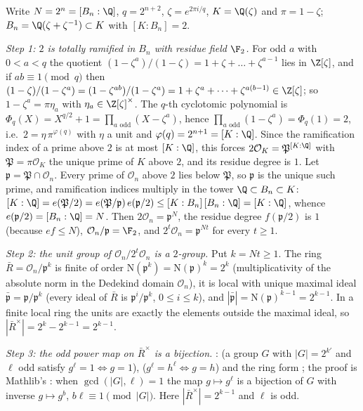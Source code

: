 Write $N=2^n=[B_n:\Q]$, $q=2^{n+2}$, $\zeta=e^{2\pi i/q}$, $K=\Q(\zeta)$ and $\pi=1-\zeta$; $B_n=\Q(\zeta+\zeta^{-1})\subset K$ with $[K:B_n]=2$.

\emph{Step 1: $2$ is totally ramified in $B_n$ with residue field $\F_2$.} For odd $a$ with $0<a<q$ the quotient $(1-\zeta^a)/(1-\zeta)=1+\zeta+\dots+\zeta^{a-1}$ lies in $\Z[\zeta]$, and if $ab\equiv1\pmod q$ then $(1-\zeta)/(1-\zeta^a)=(1-\zeta^{ab})/(1-\zeta^a)=1+\zeta^a+\dots+\zeta^{a(b-1)}\in\Z[\zeta]$; so $1-\zeta^a=\pi\eta_a$ with $\eta_a\in\Z[\zeta]^\times$. The $q$-th cyclotomic polynomial is $\Phi_q(X)=X^{q/2}+1=\prod_{a\text{ odd}}(X-\zeta^a)$, hence $\prod_{a\text{ odd}}(1-\zeta^a)=\Phi_q(1)=2$, i.e.\ $2=\eta\,\pi^{\varphi(q)}$ with $\eta$ a unit and $\varphi(q)=2^{n+1}=[K:\Q]$. Since the ramification index of a prime above $2$ is at most $[K:\Q]$, this forces $2\mathcal O_K=\mathfrak P^{[K:\Q]}$ with $\mathfrak P=\pi\mathcal O_K$ the unique prime of $K$ above $2$, and its residue degree is $1$. Let $\mathfrak p=\mathfrak P\cap\mathcal O_n$. Every prime of $\mathcal O_n$ above $2$ lies below $\mathfrak P$, so $\mathfrak p$ is the unique such prime, and ramification indices multiply in the tower $\Q\subset B_n\subset K$: $[K:\Q]=e(\mathfrak P/2)=e(\mathfrak P/\mathfrak p)\,e(\mathfrak p/2)\le[K:B_n]\,[B_n:\Q]=[K:\Q]$, whence $e(\mathfrak p/2)=[B_n:\Q]=N$. Then $2\mathcal O_n=\mathfrak p^N$, the residue degree $f(\mathfrak p/2)$ is $1$ (because $e f\le N$), $\mathcal O_n/\mathfrak p=\F_2$, and $2^t\mathcal O_n=\mathfrak p^{Nt}$ for every $t\ge1$.

\emph{Step 2: the unit group of $\mathcal O_n/2^t\mathcal O_n$ is a $2$-group.} Put $k=Nt\ge1$. The ring $\bar R=\mathcal O_n/\mathfrak p^{k}$ is finite of order $\mathrm N(\mathfrak p^{k})=\mathrm N(\mathfrak p)^{k}=2^{k}$ (multiplicativity of the absolute norm in the Dedekind domain $\mathcal O_n$), it is local with unique maximal ideal $\bar{\mathfrak p}=\mathfrak p/\mathfrak p^{k}$ (every ideal of $\bar R$ is $\mathfrak p^i/\mathfrak p^{k}$, $0\le i\le k$), and $|\bar{\mathfrak p}|=\mathrm N(\mathfrak p)^{k-1}=2^{k-1}$. In a finite local ring the units are exactly the elements outside the maximal ideal, so $|\bar R^\times|=2^{k}-2^{k-1}=2^{k-1}$.

\emph{Step 3: the odd power map on $\bar R^\times$ is a bijection.} :  (a group $G$ with $|G|=2^{k'}$ and $\ell$ odd satisfy $g^\ell=1\iff g=1$),  ($g^\ell=h^\ell\iff g=h$) and the ring form ; the proof is Mathlib's : when $\gcd(|G|,\ell)=1$ the map $g\mapsto g^\ell$ is a bijection of $G$ with inverse $g\mapsto g^{b}$, $b\ell\equiv1\pmod{|G|}$. Here $|\bar R^\times|=2^{k-1}$ and $\ell$ is odd.

